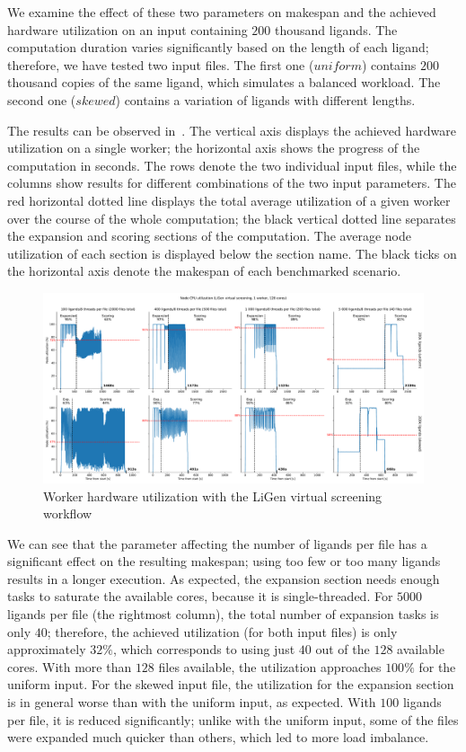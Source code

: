 We examine the effect of these two parameters on makespan and the achieved hardware utilization on
an input containing $200$ thousand ligands. The computation duration varies
significantly based on the length of each ligand; therefore, we have tested two input files. The
first one ($uniform$) contains $200$ thousand copies of the same
ligand, which simulates a balanced workload. The second one ($skewed$) contains a
variation of ligands with different lengths.

The results can be observed in~. The vertical axis displays the achieved
hardware utilization on a single worker; the horizontal axis shows the progress of the computation
in seconds. The rows denote the two individual input files, while the columns show results for
different combinations of the two input parameters. The red horizontal dotted line displays the
total average utilization of a given worker over the course of the whole computation; the black
vertical dotted line separates the expansion and scoring sections of the computation. The average
node utilization of each section is displayed below the section name. The black ticks on the
horizontal axis denote the makespan of each benchmarked scenario.

\begin{figure}[h]
	\centering
	\includegraphics[width=\textwidth]{imgs/hq/charts/ligen-aggregation-utilization}
	\caption{Worker hardware utilization with the LiGen virtual screening workflow}
	\label{fig:hq-ligen-utilization}
\end{figure}

We can see that the parameter affecting the number of ligands per file has a significant effect on
the resulting makespan; using too few or too many ligands results in a longer execution. As
expected, the expansion section needs enough tasks to saturate the available cores, because it is
single-threaded. For $5000$ ligands per file (the rightmost column), the total
number of expansion tasks is only $40$; therefore, the achieved utilization (for
both input files) is only approximately $32\%$, which corresponds to using just
$40$ out of the $128$ available cores. With more than
$128$ files available, the utilization approaches $100\%$ for the
uniform input. For the skewed input file, the utilization for the expansion section is in general
worse than with the uniform input, as expected. With $100$ ligands per file, it
is reduced significantly; unlike with the uniform input, some of the files were expanded much
quicker than others, which led to more load imbalance.

